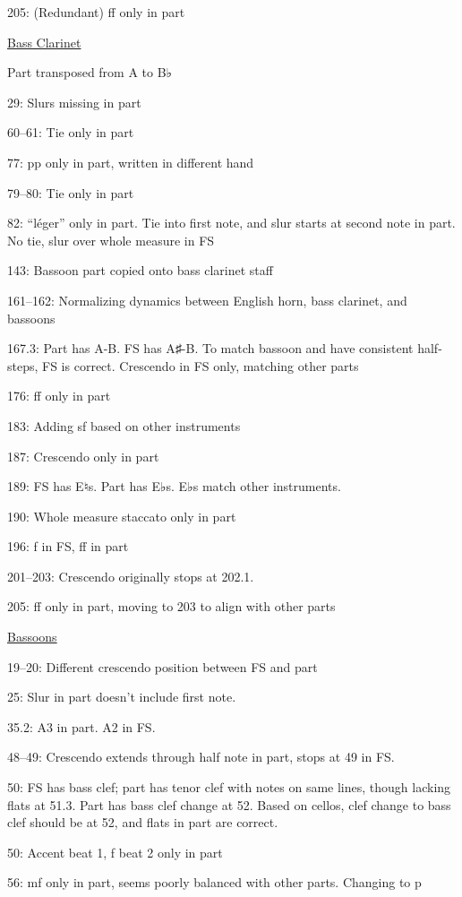 \documentclass[twoside]{article}
\begin{document}
\begin{hangparas}{15pt}{1}
\begin{multicols}{2}
205: (Redundant) ff only in part

\underline{Bass Clarinet}

Part transposed from A to B♭

29: Slurs missing in part

60--61: Tie only in part

77: pp only in part, written in different hand

79--80: Tie only in part

82: ``léger'' only in part. Tie into first note, and slur starts at second note in part. No tie, slur over whole measure in FS

143: Bassoon part copied onto bass clarinet staff

161--162: Normalizing dynamics between English horn, bass clarinet, and bassoons

167.3: Part has A-B. FS has A♯-B. To match bassoon and have consistent half-steps, FS is correct. Crescendo in FS only, matching other parts

176: ff only in part

183: Adding sf based on other instruments

187: Crescendo only in part

189: FS has E♮s. Part has E♭s. E♭s match other instruments.

190: Whole measure staccato only in part

196: f in FS, ff in part

201--203: Crescendo originally stops at 202.1.

205: ff only in part, moving to 203 to align with other parts

\underline{Bassoons}

19--20: Different crescendo position between FS and part

25: Slur in part doesn't include first note.

35.2: A3 in part. A2 in FS.

48--49: Crescendo extends through half note in part, stops at 49 in FS.

50: FS has bass clef; part has tenor clef with notes on same lines, though lacking flats at 51.3. Part has bass clef change at 52. Based on cellos, clef change to bass clef should be at 52, and flats in part are correct.

50: Accent beat 1, f beat 2 only in part

56: mf only in part, seems poorly balanced with other parts. Changing to p


\end{multicols}
\end{hangparas}
\end{document}
